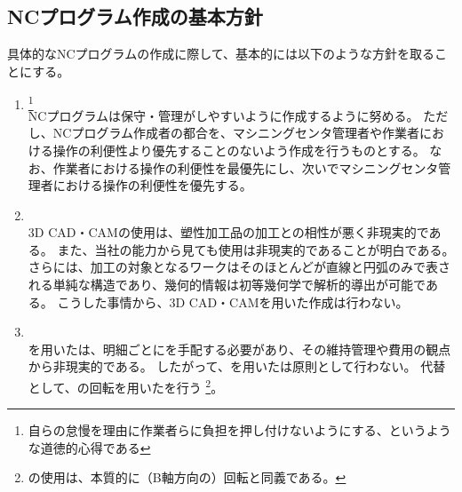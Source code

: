 \clearpage


\subsection{NCプログラム作成の基本方針}
具体的なNCプログラムの作成に際して、基本的には以下のような方針を取ることにする。
\begin{enumerate}[label*=\alph*)]
\item {}
\footnote{自らの怠慢を理由に作業者らに負担を押し付けないようにする、というような道徳的心得である}\\
NCプログラムは保守・管理がしやすいように作成するように努める。
ただし、NCプログラム作成者の都合を、マシニングセンタ管理者や作業者における操作の利便性より優先することのないよう作成を行うものとする。
なお、作業者における操作の利便性を最優先にし、次いでマシニングセンタ管理者における操作の利便性を優先する。
\item {}\\
3D CAD・CAMの使用は、塑性加工品の加工との相性が悪く非現実的である。
また、当社の能力から見ても使用は非現実的であることが明白である。
さらには、加工の対象となるワークはそのほとんどが直線と円弧のみで表される単純な構造であり、幾何的情報は初等幾何学で解析的導出が可能である。
こうした事情から、3D CAD・CAMを用いた作成は行わない。
\item {}\\
\Spacer を用いた\AlocationAdjustment は、明細ごとに\Spacer を手配する必要があり、その維持管理や費用の観点から非現実的である。
したがって、\Spacer を用いた\AlocationAdjustment は原則として行わない。
代替として、\Table の回転を用いた\AlocationAdjustment を行う
\footnote{\Spacer の使用は、本質的に（B軸方向の）回転と同義である。}。

\end{enumerate}
